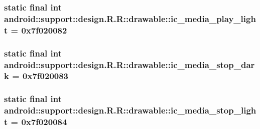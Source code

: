 \hypertarget{classandroid_1_1support_1_1design_1_1_r_1_1drawable_ea192df26537430fb2514a9762438e56}{
\subsubsection[{ic\_\-media\_\-play\_\-light}]{\setlength{\rightskip}{0pt plus 5cm}static final int android::support::design.R.R::drawable::ic\_\-media\_\-play\_\-light = 0x7f020082}}
\label{classandroid_1_1support_1_1design_1_1_r_1_1drawable_ea192df26537430fb2514a9762438e56}


\hypertarget{classandroid_1_1support_1_1design_1_1_r_1_1drawable_7d0ae2eb797a0b13921b3e5895c4f70b}{
\subsubsection[{ic\_\-media\_\-stop\_\-dark}]{\setlength{\rightskip}{0pt plus 5cm}static final int android::support::design.R.R::drawable::ic\_\-media\_\-stop\_\-dark = 0x7f020083}}
\label{classandroid_1_1support_1_1design_1_1_r_1_1drawable_7d0ae2eb797a0b13921b3e5895c4f70b}


\hypertarget{classandroid_1_1support_1_1design_1_1_r_1_1drawable_54a9c636161efdb8317b2ada2dd6efed}{
\subsubsection[{ic\_\-media\_\-stop\_\-light}]{\setlength{\rightskip}{0pt plus 5cm}static final int android::support::design.R.R::drawable::ic\_\-media\_\-stop\_\-light = 0x7f020084}}
\label{classandroid_1_1support_1_1design_1_1_r_1_1drawable_54a9c636161efdb8317b2ada2dd6efed}


